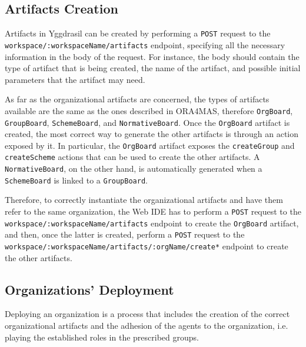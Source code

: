 \subsection{Artifacts Creation}
Artifacts in Yggdrasil can be created by performing a \texttt{POST} request to the \texttt{workspace/:workspaceName/artifacts} endpoint, specifying all the necessary information in the body of the request.
For instance, the body should contain the type of artifact that is being created, the name of the artifact, and possible initial parameters that the artifact may need.

As far as the organizational artifacts are concerned, the types of artifacts available are the same as the ones described in \textsf{ORA4MAS}, therefore \texttt{OrgBoard}, \texttt{GroupBoard}, \texttt{SchemeBoard}, and \texttt{NormativeBoard}.
Once the \texttt{OrgBoard} artifact is created, the most correct way to generate the other artifacts is through an action exposed by it.
In particular, the \texttt{OrgBoard} artifact exposes the \texttt{createGroup} and \texttt{createScheme} actions that can be used to create the other artifacts.
A \texttt{NormativeBoard}, on the other hand, is automatically generated when a \texttt{SchemeBoard} is linked to a \texttt{GroupBoard}.

Therefore, to correctly instantiate the organizational artifacts and have them refer to the same organization, the Web IDE has to perform a \texttt{POST} request to the \texttt{workspace/:workspaceName/artifacts} endpoint to create the \texttt{OrgBoard} artifact, and then, once the latter is created, perform a \texttt{POST} request to the \texttt{workspace/:workspaceName/artifacts/:orgName/create*} endpoint to create the other artifacts.

\subsection{Organizations' Deployment}
Deploying an organization is a process that includes the creation of the correct organizational artifacts and the adhesion of the agents to the organization, i.e. playing the established roles in the prescribed groups.

